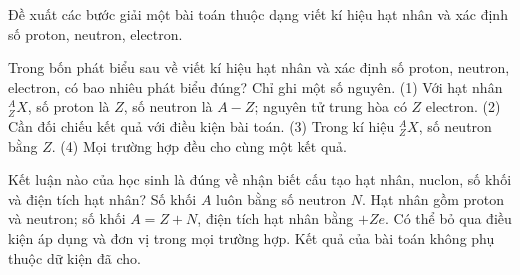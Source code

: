 \begin{bt}
Đề xuất các bước giải một bài toán thuộc dạng viết kí hiệu hạt nhân và xác định số proton, neutron, electron.
\end{bt}

\begin{ex}
Trong bốn phát biểu sau về viết kí hiệu hạt nhân và xác định số proton, neutron, electron, có bao nhiêu phát biểu đúng? Chỉ ghi một số nguyên. (1) Với hạt nhân $^{A}_{Z}X$, số proton là $Z$, số neutron là $A-Z$; nguyên tử trung hòa có $Z$ electron. (2) Cần đối chiếu kết quả với điều kiện bài toán. (3) Trong kí hiệu $^{A}_{Z}X$, số neutron bằng $Z$. (4) Mọi trường hợp đều cho cùng một kết quả.
\end{ex}

\begin{ex}
Kết luận nào của học sinh là đúng về nhận biết cấu tạo hạt nhân, nuclon, số khối và điện tích hạt nhân?
\choice
{Số khối $A$ luôn bằng số neutron $N$.}
{\True Hạt nhân gồm proton và neutron; số khối $A=Z+N$, điện tích hạt nhân bằng $+Ze$.}
{Có thể bỏ qua điều kiện áp dụng và đơn vị trong mọi trường hợp.}
{Kết quả của bài toán không phụ thuộc dữ kiện đã cho.}
\end{ex}

